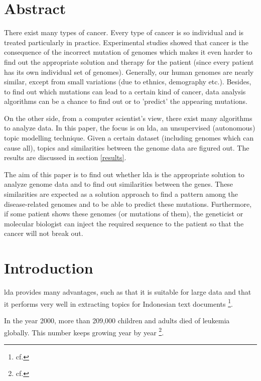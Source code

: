 





\chapter{Abstract}\label{abstract}

There exist many types of cancer. Every type of cancer is so individual and is treated particularly in practice. Experimental studies showed that cancer is the consequence of the incorrect mutation of genomes which makes it even harder to find out the appropriate solution and therapy for the patient (since every patient has its own individual set of genomes). Generally, our human genomes are nearly similar, except from small variations (due to ethnics, demography etc.). Besides, to find out which mutations can lead to a certain kind of cancer, data analysis algorithms can be a chance to find out or to 'predict' the appearing mutations.

On the other side, from a computer scientist's view, there exist many algorithms to analyze data. In this paper, the focus is on \gls{lda}, an unsupervised (autonomous) topic modelling technique. Given a certain dataset (including genomes which can cause \gls{all}), topics and similarities between the genome data are figured out. The results are discussed in section \ref{results}.

The aim of this paper is to find out whether \gls{lda} is the appropriate solution to analyze genome data and to find out similarities between the genes. These similarities are expected as a solution approach to find a pattern among the disease-related genomes and to be able to predict these mutations. Furthermore, if some patient shows these genomes (or mutations of them), the geneticist or molecular biologist can inject the required sequence to the patient so that the cancer will not break out.


\chapter{Introduction}\label{introduction}

\gls{lda} provides many advantages, such as that it is suitable for large data and that it performs very well in extracting topics for Indonesian text documents \footnote{cf.\autocite{twinandilla_2018}}.

In the year 2000, more than 209,000 children and adults died of leukemia globally. This number keeps growing year by year \footnote{cf.\autocite{tang}}.

